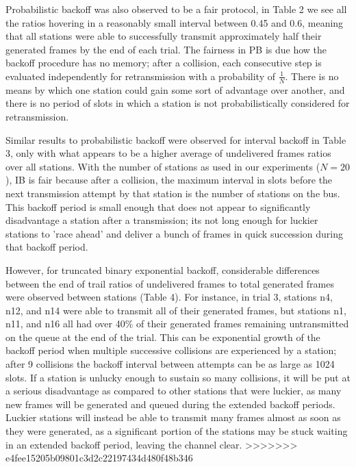 \documentclass[twocolumn]{article}
\begin{document}
Probabilistic backoff was also observed to be a fair protocol, in Table 2 we see all the 
ratios hovering in a reasonably small interval between 0.45 and 0.6, meaning that all stations
were able to successfully transmit approximately half their generated frames by the end of each
trial. The fairness in PB is due how the backoff procedure has no memory; after a collision,
each consecutive step is evaluated independently for retransmission with a probability of 
$\frac{1}{N}$. There is no means by which one station could gain some sort of advantage over
another, and there is no period of slots in which a station is not probabilistically considered
for retransmission.

Similar results to probabilistic backoff were observed for interval backoff in Table 3, only 
with what appears to be a higher average of undelivered frames ratios over all stations. With
the number of stations as used in our experiments ($N=20$), IB is fair because
after a collision, the maximum interval in slots before the next transmission
attempt by that station is the number of stations on the bus. This backoff period is 
small enough that does not appear to significantly disadvantage a station after a transmission;
its not long enough for luckier stations to 'race ahead' and deliver a bunch of frames in 
quick succession during that backoff period.

However, for truncated binary exponential backoff, considerable differences
between the end of trail ratios of undelivered frames to total generated frames
were observed between stations (Table 4). For instance, in trial 3, stations n4,
n12, and n14 were able to transmit all of their generated frames, but stations
n1, n11, and n16 all had over 40\% of their generated frames remaining
untransmitted on the queue at the end of the trial. This can be exponential
growth of the backoff period when multiple successive collisions are experienced
by a station; after 9 collisions the backoff interval between attempts can be as
large as 1024 slots. If a station is unlucky enough to sustain so many
collisions, it will be put at a serious disadvantage as compared to other
stations that were luckier, as many new frames will be generated and queued
during the extended backoff periods. Luckier stations will instead be able to transmit many
frames almost as soon as they were generated, as a significant portion of the stations
may be stuck waiting in an extended backoff period, leaving the channel clear.
>>>>>>> e4fee15205b09801c3d2c22197434d480f48b346
\end{document}
